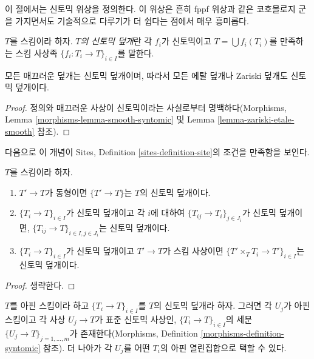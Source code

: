\noindent
이 절에서는 신토믹 위상을 정의한다. 이 위상은 흔히 fppf 위상과 같은
코호몰로지 군을 가지면서도 기술적으로 다루기가 더 쉽다는 점에서 매우
흥미롭다.

\begin{definition}
\label{definition-syntomic-covering}
$T$를 스킴이라 하자. {\it $T$의 신토믹 덮개}란 각 $f_i$가 신토믹이고
$T = \bigcup f_i(T_i)$를 만족하는 스킴 사상족
$\{f_i : T_i \to T\}_{i \in I}$를 말한다.
\end{definition}

\begin{lemma}
\label{lemma-zariski-etale-smooth-syntomic}
모든 매끄러운 덮개는 신토믹 덮개이며, 따라서 모든 에탈 덮개나
Zariski 덮개도 신토믹 덮개이다.
\end{lemma}

\begin{proof}
정의와 매끄러운 사상이 신토믹이라는 사실로부터 명백하다(Morphisms,
Lemma \ref{morphisms-lemma-smooth-syntomic} 및 Lemma
\ref{lemma-zariski-etale-smooth} 참조).
\end{proof}

\noindent
다음으로 이 개념이 Sites, Definition \ref{sites-definition-site}의
조건을 만족함을 보인다.

\begin{lemma}
\label{lemma-syntomic}
$T$를 스킴이라 하자.
\begin{enumerate}
\item $T' \to T$가 동형이면 $\{T' \to T\}$는 $T$의 신토믹 덮개이다.
\item $\{T_i \to T\}_{i\in I}$가 신토믹 덮개이고 각 $i$에 대하여
$\{T_{ij} \to T_i\}_{j\in J_i}$가 신토믹 덮개이면,
$\{T_{ij} \to T\}_{i \in I, j\in J_i}$는 신토믹 덮개이다.
\item $\{T_i \to T\}_{i\in I}$가 신토믹 덮개이고 $T' \to T$가 스킴
사상이면 $\{T' \times_T T_i \to T'\}_{i\in I}$는 신토믹 덮개이다.
\end{enumerate}
\end{lemma}

\begin{proof}
생략한다.
\end{proof}

\begin{lemma}
\label{lemma-syntomic-affine}
$T$를 아핀 스킴이라 하고 $\{T_i \to T\}_{i \in I}$를 $T$의 신토믹
덮개라 하자. 그러면 각 $U_j$가 아핀 스킴이고 각 사상 $U_j \to T$가
표준 신토믹 사상인, $\{T_i \to T\}_{i \in I}$의 세분
$\{U_j \to T\}_{j = 1, \ldots, m}$가 존재한다(Morphisms, Definition
\ref{morphisms-definition-syntomic} 참조). 더 나아가 각 $U_j$를 어떤
$T_i$의 아핀 열린집합으로 택할 수 있다.
\end{lemma}

